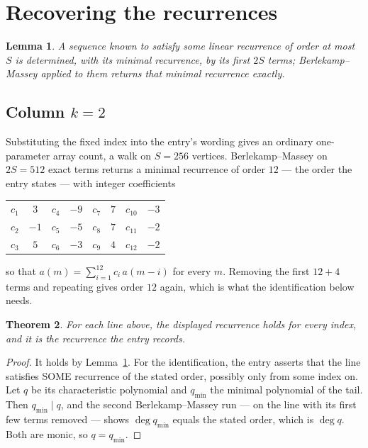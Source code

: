 \documentclass[11pt,a4paper]{article}
\theoremstyle{plain}
\newtheorem{theorem}{Theorem}
\newtheorem{lemma}[theorem]{Lemma}
\theoremstyle{definition}
\begin{document}
\section{Recovering the recurrences}

\begin{lemma}\label{lem:bm}
A sequence known to satisfy some linear recurrence of order at most $S$ is determined, with its
minimal recurrence, by its first $2S$ terms; Berlekamp--Massey applied to them returns that
minimal recurrence exactly.
\end{lemma}

\subsection*{Column $k=2$}
Substituting the fixed index into the entry's wording gives an ordinary one-parameter array
count, a walk on $S=256$ vertices. Berlekamp--Massey on $2S=512$ exact terms
returns a minimal recurrence of order $12$ --- the order the entry states --- with
integer coefficients
\begin{center}\small\begin{tabular}{cccccccc}
$c_{1}$ & $3$ & $c_{4}$ & $-9$ & $c_{7}$ & $7$ & $c_{10}$ & $-3$ \\
$c_{2}$ & $-1$ & $c_{5}$ & $-5$ & $c_{8}$ & $7$ & $c_{11}$ & $-2$ \\
$c_{3}$ & $5$ & $c_{6}$ & $-3$ & $c_{9}$ & $4$ & $c_{12}$ & $-2$ \\
\end{tabular}\end{center}
so that $a(m)=\sum_{i=1}^{12}c_i\,a(m-i)$ for every $m$. Removing the first
$12+4$ terms and repeating gives order $12$ again, which is what the
identification below needs.

\begin{theorem}
For each line above, the displayed recurrence holds for every index, and it is the recurrence
the entry records.
\end{theorem}

\begin{proof}
It holds by Lemma~\ref{lem:bm}. For the identification, the entry asserts that the line
satisfies SOME recurrence of the stated order, possibly only from some index on. Let $q$ be its
characteristic polynomial and $q_{\min}$ the minimal polynomial of the tail. Then
$q_{\min}\mid q$, and the second Berlekamp--Massey run --- on the line with its first few
terms removed --- shows $\deg q_{\min}$ equals the stated order, which is $\deg q$. Both are
monic, so $q=q_{\min}$.
\end{proof}
\end{document}
